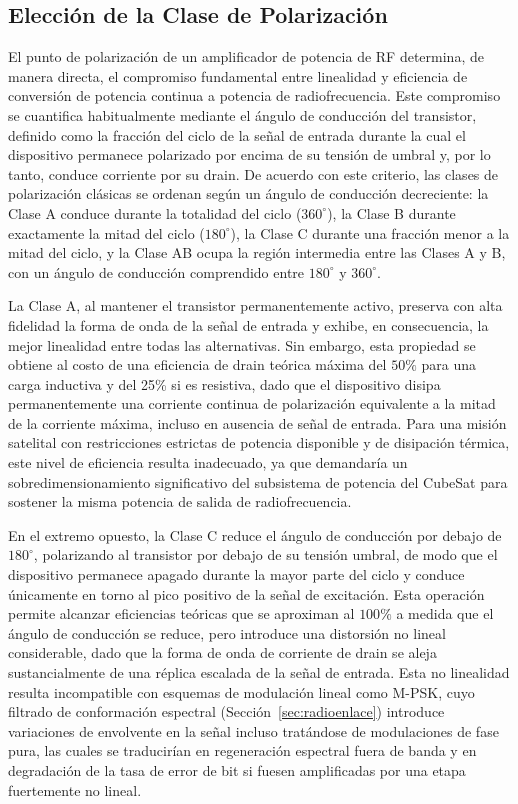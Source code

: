 \subsection{Elección de la Clase de Polarización} \label{sec:clase_polarizacion}

El punto de polarización de un amplificador de potencia de RF determina, de manera directa, el compromiso fundamental entre linealidad y eficiencia de conversión de potencia continua a potencia de radiofrecuencia. Este compromiso se cuantifica habitualmente mediante el ángulo de conducción del transistor, definido como la fracción del ciclo de la señal de entrada durante la cual el dispositivo permanece polarizado por encima de su tensión de umbral y, por lo tanto, conduce corriente por su drain. De acuerdo con este criterio, las clases de polarización clásicas se ordenan según un ángulo de conducción decreciente: la Clase A conduce durante la totalidad del ciclo ($360^\circ$), la Clase B durante exactamente la mitad del ciclo ($180^\circ$), la Clase C durante una fracción menor a la mitad del ciclo, y la Clase AB ocupa la región intermedia entre las Clases A y B, con un ángulo de conducción comprendido entre $180^\circ$ y $360^\circ$.

La Clase A, al mantener el transistor permanentemente activo, preserva con alta fidelidad la forma de onda de la señal de entrada y exhibe, en consecuencia, la mejor linealidad entre todas las alternativas. Sin embargo, esta propiedad se obtiene al costo de una eficiencia de drain teórica máxima del $50\%$ para una carga inductiva y del 25\% si es resistiva, dado que el dispositivo disipa permanentemente una corriente continua de polarización equivalente a la mitad de la corriente máxima, incluso en ausencia de señal de entrada. Para una misión satelital con restricciones estrictas de potencia disponible y de disipación térmica, este nivel de eficiencia resulta inadecuado, ya que demandaría un sobredimensionamiento significativo del subsistema de potencia del CubeSat para sostener la misma potencia de salida de radiofrecuencia.

En el extremo opuesto, la Clase C reduce el ángulo de conducción por debajo de $180^\circ$, polarizando al transistor por debajo de su tensión umbral, de modo que el dispositivo permanece apagado durante la mayor parte del ciclo y conduce únicamente en torno al pico positivo de la señal de excitación. Esta operación permite alcanzar eficiencias teóricas que se aproximan al $100\%$ a medida que el ángulo de conducción se reduce, pero introduce una distorsión no lineal considerable, dado que la forma de onda de corriente de drain se aleja sustancialmente de una réplica escalada de la señal de entrada. Esta no linealidad resulta incompatible con esquemas de modulación lineal como M-PSK, cuyo filtrado de conformación espectral (Sección~\ref{sec:radioenlace}) introduce variaciones de envolvente en la señal incluso tratándose de modulaciones de fase pura, las cuales se traducirían en regeneración espectral fuera de banda y en degradación de la tasa de error de bit si fuesen amplificadas por una etapa fuertemente no lineal.


